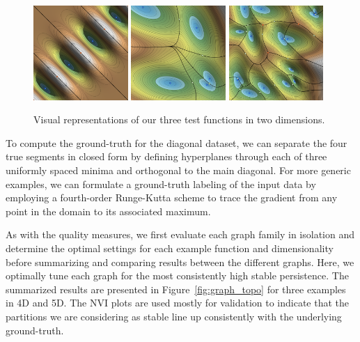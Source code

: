 \begin{figure}[htbp]
    \includegraphics[width=0.32\textwidth]{figs/chap7/diag4.png}
    \includegraphics[width=0.32\textwidth]{figs/chap7/df5.png}
    \includegraphics[width=0.32\textwidth]{figs/chap7/df15.png}
    \caption[Two-dimensional test functions for topological stability analysis]{Visual representations of our three test functions in two dimensions.}
    \label{fig:datasets}
\end{figure}

To compute the ground-truth for the diagonal dataset, we can separate the four true segments in closed form by defining hyperplanes through each of three uniformly spaced minima and orthogonal to the main diagonal.
%
For more generic examples, we can formulate a ground-truth labeling of the input data by employing a fourth-order Runge-Kutta scheme to trace the gradient from any point in the domain to its associated maximum.

As with the quality measures, we first evaluate each graph family in isolation and determine the optimal settings for each example function and dimensionality before summarizing and comparing results between the different graphs.
%
Here, we optimally tune each graph for the most consistently high stable persistence.
%
The summarized results are presented in Figure~\ref{fig:graph_topo} for three examples in 4D and 5D.
%
The NVI plots are used mostly for validation to indicate that the partitions we are considering as stable line up consistently with the underlying ground-truth.

